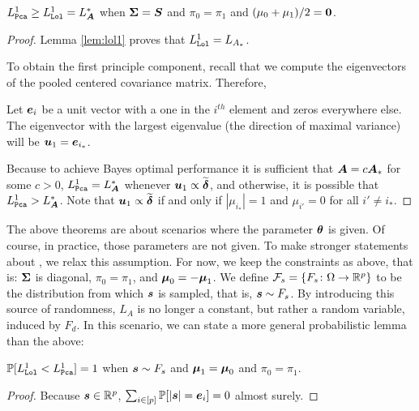 \documentclass[10pt]{article}
\begin{document}
\begin{lem}
$L_{{\sc \texttt{Pca}}}^1 \geq L_{{\sc \texttt{Lol}}}^1  = L_{\boldsymbol{A}}^*$ when $\boldsymbol{\Sigma}=\boldsymbol{S}$ and $\pi_0=\pi_1$ and $(\mu_0+\mu_1)/2=\boldsymbol{0}$.
\end{lem}
\begin{proof}
Lemma \ref{lem:lol1} proves that $L_{{\sc \texttt{Lol}}}^1=L_{A_*}$.


To obtain the first principle component, recall that we compute the eigenvectors of the pooled centered covariance matrix.
Therefore, 

Let $\boldsymbol{e}_i$ be a unit vector with a one in the $i^{th}$ element and zeros everywhere else.
The eigenvector with the largest eigenvalue  (the direction of maximal variance) will be 
$\boldsymbol{u}_1=\boldsymbol{e}_{i_*}$.

Because  to achieve Bayes optimal performance it is sufficient that  $\boldsymbol{A} = c \boldsymbol{A}_*$ for some $c > 0$, 
$L_{{\sc \texttt{Pca}}}^1=L_{\boldsymbol{A}}^*$ whenever $\boldsymbol{u}_1 \propto \widetilde{\boldsymbol{\delta}}$, and otherwise, it is possible that $L_{{\sc \texttt{Pca}}}^1>L_{\boldsymbol{A}}^*$.
Note that $\boldsymbol{u}_1 \propto \widetilde{\boldsymbol{\delta}}$ if and only if $|\mu_{i_*}|=1$ and $\mu_{i'}=0$ for all $i' \neq i_*$.
\end{proof}


The above theorems are about scenarios where the parameter $\boldsymbol{\theta}$ is given.  Of course, in practice, those parameters are not given.  To make stronger statements about \Lol, we relax this assumption. 
For now, we keep the constraints as above, that is: $\boldsymbol{\Sigma}$ is diagonal, $\pi_0=\pi_1$, and $\boldsymbol{\mu}_0=-\boldsymbol{\mu}_1$.  
We define $\mathcal{F}_s=\{F_s {\colon} \Omega \to \mathbb{R}^p\}$ to be the distribution from which $\boldsymbol{s}$ is sampled, that is, $\boldsymbol{s} \sim F_s$.  By introducing this source of randomness, $L_A$ is no longer a constant, but rather a random variable, induced by $F_d$.  In this scenario, we can state a  more general probabilistic lemma than the above:
\begin{lem}
$\mathbb{P}[L_{{\sc \texttt{Lol}}}^1 < L_{{\sc \texttt{Pca}}}^1]=1$ when $\boldsymbol{s} \sim F_s$ and $\boldsymbol{\mu}_1=\boldsymbol{\mu}_0$ and $\pi_0=\pi_1$.
\end{lem}
\begin{proof}
Because $\boldsymbol{s} \in \mathbb{R}^p$, $\sum_{i \in [p]} \mathbb{P}[|\boldsymbol{s}| = \boldsymbol{e}_i] = 0$ almost surely.
\end{proof}
\end{document}
